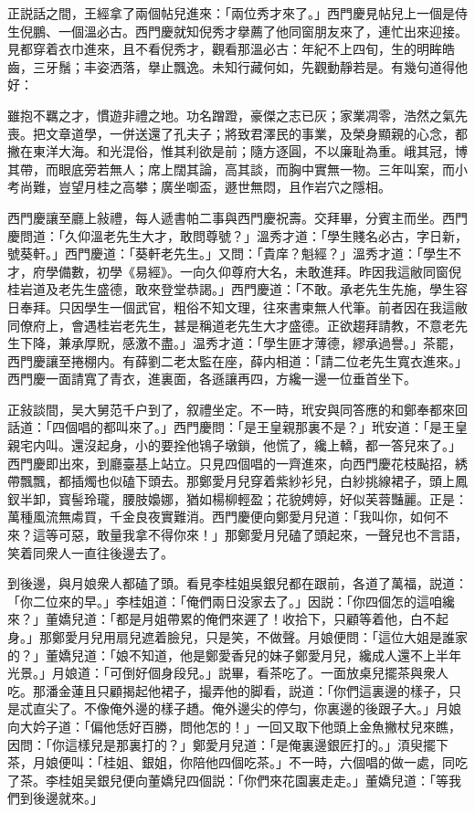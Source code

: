 正説話之間，王經拿了兩個帖兒進來：「兩位秀才來了。」西門慶見帖兒上一個是侍生倪鵬、一個溫必古。西門慶就知倪秀才擧薦了他同窗朋友來了，連忙出來迎接。見都穿着衣巾進來，且不看倪秀才，觀看那溫必古：年紀不上四旬，生的明眸皓齒，三牙鬚；丰姿洒落，擧止飄逸。未知行藏何如，先觀動靜若是。有幾句道得他好：

\begin{myquote}
雖抱不羈之才，慣遊非禮之地。功名蹭蹬，豪傑之志已灰；家業凋零，浩然之氣先喪。把文章道學，一併送還了孔夫子；將致君澤民的事業，及榮身顯親的心念，都撇在東洋大海。和光混俗，惟其利欲是前；隨方逐圓，不以廉耻為重。峨其冠，博其帶，而眼底旁若無人；席上闊其論，高其談，而胸中實無一物。三年叫案，而小考尚難，豈望月桂之高攀；廣坐啣盃，遯世無悶，且作岩穴之隱相。
\end{myquote}

西門慶讓至廳上敍禮，每人遞書帕二事與西門慶祝壽。交拜畢，分賓主而坐。西門慶問道：「久仰溫老先生大才，敢問尊號？」溫秀才道：「學生賤名必古，字日新，號葵軒。」西門慶道：「葵軒老先生。」又問：「貴庠？魁經？」溫秀才道：「學生不才，府學備數，初學《易經》。一向久仰尊府大名，未敢進拜。昨因我這敝同窗倪桂岩道及老先生盛德，敢來登堂恭謁。」西門慶道：「不敢。承老先生先施，學生容日奉拜。只因學生一個武官，粗俗不知文理，往來書柬無人代筆。前者因在我這敝同僚府上，會遇桂岩老先生，甚是稱道老先生大才盛德。正欲趨拜請教，不意老先生下降，兼承厚貺，感激不盡。」温秀才道：「學生匪才薄德，繆承過譽。」茶罷，西門慶讓至捲棚内。有薛劉二老太監在座，薛内相道：「請二位老先生寬衣進來。」西門慶一面請寬了青衣，進裏面，各遜讓再四，方纔一邊一位垂首坐下。

正敍談間，吴大舅范千户到了，叙禮坐定。不一時，玳安與同答應的和鄭奉都來回話道：「四個唱的都叫來了。」西門慶問：「是王皇親那裏不是？」玳安道：「是王皇親宅内叫。還沒起身，小的要拴他鴇子墩鎖，他慌了，纔上轎，都一答兒來了。」西門慶即出來，到廳臺基上站立。只見四個唱的一齊進來，向西門慶花枝颭招，綉帶飄飄，都插燭也似磕下頭去。那鄭愛月兒穿着紫紗衫兒，白紗挑線裙子，頭上鳳釵半卸，寳髻玲瓏，腰肢嬝娜，猶如楊柳輕盈；花貌娉婷，好似芙蓉豔麗。正是：萬種風流無䖏買，千金良夜實難消。西門慶便向鄭愛月兒道：「我叫你，如何不來？這等可惡，敢量我拿不得你來！」那鄭愛月兒磕了頭起來，一聲兒也不言語，笑着同衆人一直往後邊去了。

到後邊，與月娘衆人都磕了頭。看見李桂姐吳銀兒都在跟前，各道了萬福，説道：「你二位來的早。」李桂姐道：「俺們兩日没家去了。」因説：「你四個怎的這咱纔來？」董嬌兒道：「都是月姐帶累的俺們來遲了！收拾下，只顧等着他，白不起身。」那鄭愛月兒用扇兒遮着臉兒，只是笑，不做聲。月娘便問：「這位大姐是誰家的？」董嬌兒道：「娘不知道，他是鄭愛香兒的妹子鄭愛月兒，纔成人還不上半年光景。」月娘道：「可倒好個身段兒。」説畢，看茶吃了。一面放桌兒擺茶與衆人吃。那潘金蓮且只顧揭起他裙子，撮弄他的脚看，説道：「你們這裏邊的樣子，只是忒直尖了。不像俺外邊的樣子趫。俺外邊尖的停匀，你裏邊的後跟子大。」月娘向大妗子道：「偏他恁好百勝，問他怎的！」一回又取下他頭上金魚撇杖兒來瞧，因問：「你這樣兒是那裏打的？」鄭愛月兒道：「是俺裏邊銀匠打的。」湏臾擺下茶，月娘便叫：「桂姐、銀姐，你陪他四個吃茶。」不一時，六個唱的做一處，同吃了茶。李桂姐吴銀兒便向董嬌兒四個説：「你們來花園裏走走。」董嬌兒道：「等我們到後邊就來。」

